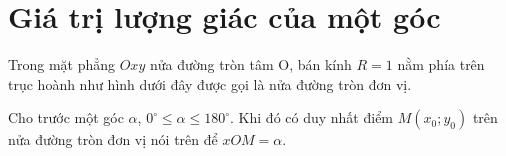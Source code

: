 \documentclass[12pt,a4paper]{extarticle}
\begin{document}
\makeheadbox[headerright={Tổng ôn 10-11},chude={CHỦ ĐỀ 03},tieude={Hệ thức lượng trong tam giác},dinhdang={Đại số},lop={12 },gv={Nguyễn Lê Minh Ngọc}]

\vspace{2em}
\section{Giá trị lượng giác của một góc}
Trong mặt phẳng $Oxy$ nửa đường tròn tâm O, bán kính $R=1$ nằm phía trên trục hoành như hình dưới đây được gọi là nửa đường tròn đơn vị.\\
\vspace{1cm}

Cho trước một góc $\alpha$, $0^\circ \le \alpha \le 180^\circ$. Khi đó có duy nhất điểm $M(x_0; y_0)$ trên nửa đường tròn đơn vị nói trên để $xOM = \alpha$.
\end{document}
